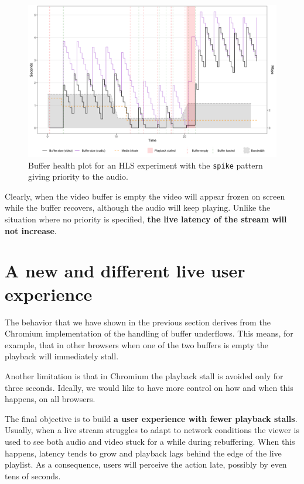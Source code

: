 \begin{figure}[h]
    \centering
    \includegraphics[width=\textwidth]{res/impr_hls_pri.png}
    \caption{Buffer health plot for an HLS experiment with the \texttt{spike} pattern giving priority to the audio.}
    \label{fig:improvements_hls_pri}
\end{figure}

Clearly, when the video buffer is empty the video will appear frozen on screen while the buffer recovers, although the audio will keep playing. Unlike the situation where no priority is specified, \textbf{the live latency of the stream will not increase}.

\section{A new and different live user experience}
\label{sec:improvements/ux}

The behavior that we have shown in the previous section derives from the Chromium implementation of the handling of buffer underflows. This means, for example, that in other browsers when one of the two buffers is empty the playback will immediately stall.

Another limitation is that in Chromium the playback stall is avoided only for three seconds. Ideally, we would like to have more control on how and when this happens, on all browsers.

The final objective is to build \textbf{a user experience with fewer playback stalls}. Usually, when a live stream struggles to adapt to network conditions the viewer is used to see both audio and video stuck for a while during rebuffering. When this happens, latency tends to grow and playback lags behind the edge of the live playlist. As a consequence, users will perceive the action late, possibly by even tens of seconds.

